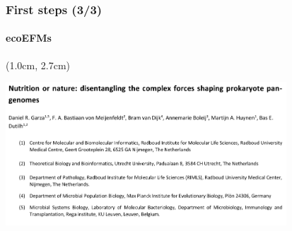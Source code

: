 \documentclass{beamer}
\begin{document}
   \begin{frame}
      \frametitle{First steps (3/3)}
      \framesubtitle{ecoEFMs}

      \begin{singlespace}
         
         \begin{textblock*}{10cm}(1.0cm, 2.7cm)
            

            \centering
            \includegraphics[width=105mm]{resources/nature_nutrition.png}

               

               
               

\end{textblock*}
\end{singlespace}
\end{frame}
\end{document}
